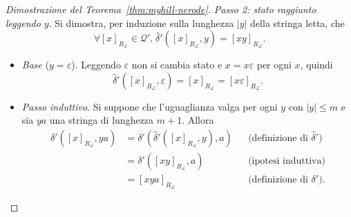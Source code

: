 \documentclass[a4paper, 11pt, oneside]{book}
\theoremstyle{formale}
\begin{document}
\begin{proof}[Dimostrazione del Teorema~\ref{thm:myhill-nerode}]
        \emph{Passo 2: stato raggiunto leggendo $y$}. Si dimostra, per induzione sulla
        lunghezza $|y|$ della stringa letta, che
        \begin{equation*}
            \forall [x]_{R_{\mathcal{L}}} \in \mathcal{Q}'.\;
            \hat{\delta}'([x]_{R_{\mathcal{L}}}, y) = [xy]_{R_{\mathcal{L}}}.
        \end{equation*}
        \begin{itemize}
            \item \textit{Base} ($y = \varepsilon$). Leggendo $\varepsilon$ non si cambia
                stato e $x = x\varepsilon$ per ogni $x$, quindi
                \begin{equation*}
                    \hat{\delta}'([x]_{R_{\mathcal{L}}}, \varepsilon)
                    = [x]_{R_{\mathcal{L}}} = [x\varepsilon]_{R_{\mathcal{L}}}.
                \end{equation*}
            \item \textit{Passo induttivo}. Si suppone che l'uguaglianza valga per ogni
                $y$ con $|y| \leq m$ e sia $ya$ una stringa di lunghezza $m + 1$. Allora
                \begin{align*}
                    \hat{\delta}'([x]_{R_{\mathcal{L}}}, ya)
                        &= \delta'(\hat{\delta}'([x]_{R_{\mathcal{L}}}, y), a)
                            && \text{(definizione di $\hat{\delta}'$)} \\
                        &= \delta'([xy]_{R_{\mathcal{L}}}, a)
                            && \text{(ipotesi induttiva)} \\
                        &= [xya]_{R_{\mathcal{L}}}
                            && \text{(definizione di $\delta'$)}.
                \end{align*}
        \end{itemize}


\end{proof}
\end{document}
